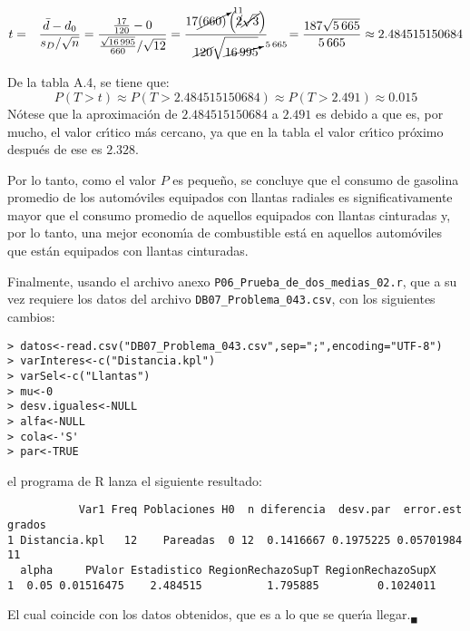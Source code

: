 \begin{solucion}
 \begin{estadistico}
  \begin{eqnarray*}
   t & = & \frac{\bar{d} - d_0}{s_D/\sqrt{n}} 
   = \frac{\frac{17}{120} - 0}{\frac{\sqrt{16\,995}}{660}/\sqrt{12}}
   = \frac{
   17\cancelto{11}{(660)}\left( \cancel{2}\cancel{\sqrt{3}} \right)
   }{
   \cancel{120}\sqrt{\cancelto{5\,665}{16\,995}}
   } \hspace{0.5cm}
   = \frac{187\sqrt{5\,665}}{5\,665}
   \approx 2.484515150684
  \end{eqnarray*}
 \end{estadistico}

 \begin{valorp}
  De la tabla A.4, se tiene que:
  \begin{equation*}
   P\left( T > t \right) \approx P(T > 2.484515150684)
   \approx P(T > 2.491) \approx 0.015
  \end{equation*}
  N\'otese que la aproximaci\'on de $2.484515150684$ a $2.491$
  es debido a que es, por mucho, el valor cr\'{\i}tico m\'as cercano,
  ya que en la tabla el valor cr\'{\i}tico pr\'oximo despu\'es
  de ese es $2.328$.
 \end{valorp}

 \begin{conclusion}
  Por lo tanto, como el valor $P$ es peque\~no,
  se concluye que el consumo de gasolina promedio
  de los autom\'oviles equipados con llantas radiales
  es significativamente mayor que el consumo promedio
  de aquellos equipados con llantas cinturadas
  y, por lo tanto, una mejor econom\'{\i}a de combustible
  est\'a en aquellos autom\'oviles que est\'an equipados
  con llantas cinturadas.
 \end{conclusion}

 Finalmente, usando el archivo anexo
 \texttt{P06\_Prueba\_de\_dos\_medias\_02.r},
 que a su vez requiere los datos del archivo
 \texttt{DB07\_Problema\_043.csv},
 con los siguientes cambios:
 \begin{verbatim}
> datos<-read.csv("DB07_Problema_043.csv",sep=";",encoding="UTF-8")
> varInteres<-c("Distancia.kpl")
> varSel<-c("Llantas")
> mu<-0
> desv.iguales<-NULL
> alfa<-NULL
> cola<-'S'
> par<-TRUE
 \end{verbatim}
 \vspace{-0.5cm}
 el programa de R lanza el siguiente resultado:
 \begin{verbatim}
           Var1 Freq Poblaciones H0  n diferencia  desv.par  error.est grados
1 Distancia.kpl   12    Pareadas  0 12  0.1416667 0.1975225 0.05701984     11
  alpha     PValor Estadistico RegionRechazoSupT RegionRechazoSupX
1  0.05 0.01516475    2.484515          1.795885         0.1024011
 \end{verbatim}
 \vspace{-0.5cm}
 El cual coincide con los datos obtenidos,
 que es a lo que se quer\'{\i}a llegar.${}_{\blacksquare}$
\end{solucion}
